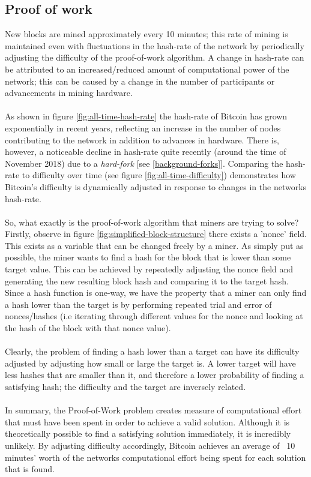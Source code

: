 \subsection{Proof of work}\label{background-proof-of-work}
New blocks are mined approximately every 10 minutes; this rate of mining is maintained even with fluctuations in the hash-rate of the network by periodically adjusting the difficulty of the proof-of-work algorithm. A change in hash-rate can be attributed to an increased/reduced amount of computational power of the network; this can be caused by a change in the number of participants or advancements in mining hardware.
\\\\
As shown in figure \ref{fig:all-time-hash-rate} the hash-rate of Bitcoin has grown exponentially in recent years, reflecting an increase in the number of nodes contributing to the network in addition to advances in hardware. There is, however, a noticeable decline in hash-rate quite recently (around the time of November 2018) due to a \textit{hard-fork} [see \ref{background-forks}]. Comparing the hash-rate to difficulty over time (see figure \ref{fig:all-time-difficulty}) demonstrates how Bitcoin's difficulty is dynamically adjusted in response to changes in the networks hash-rate. 
\\\\
So, what exactly is the proof-of-work algorithm that miners are trying to solve? Firstly, observe in figure \ref{fig:simplified-block-structure} there exists a 'nonce' field. This exists as a variable that can be changed freely by a miner. As simply put as possible, the miner wants to find a hash for the block that is lower than some target value. This can be achieved by repeatedly adjusting the nonce field and generating the new resulting block hash and comparing it to the target hash. Since a hash function is one-way, we have the property that a miner can only find a hash lower than the target is by performing repeated trial and error of nonces/hashes (i.e iterating through different values for the nonce and looking at the hash of the block with that nonce value).
\\\\
Clearly, the problem of finding a hash lower than a target can have its difficulty adjusted by adjusting how small or large the target is. A lower target will have less hashes that are smaller than it, and therefore a lower probability of finding a satisfying hash; the difficulty and the target are inversely related. 
\\\\
In summary, the Proof-of-Work problem creates measure of computational effort that must have been spent in order to achieve a valid solution. Although it is theoretically possible to find a satisfying solution immediately, it is incredibly unlikely. By adjusting difficulty accordingly, Bitcoin achieves an average of ~10 minutes' worth of the networks computational effort being spent for each solution that is found. 

